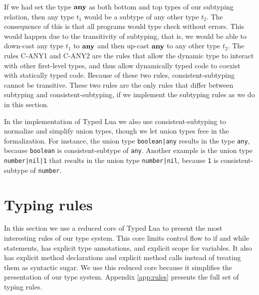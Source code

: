 If we had set the type $\mathbf{any}$ as both bottom and top types of our
subtyping relation, then any type $t_{1}$ would be a subtype of
any other type $t_{2}$.
The consequence of this is that all programs would type check without errors.
This would happen due to the transitivity of subtyping, that is,
we would be able to down-cast any type $t_{1}$ to $\mathbf{any}$ and then up-cast
$\mathbf{any}$ to any other type $t_{2}$.
The rules \textsc{C-ANY1} and \textsc{C-ANY2} are the rules that
allow the dynamic type to interact with other first-level types,
and thus allow dynamically typed code to coexist with statically
typed code.
Because of these two rules, consistent-subtyping cannot be transitive.
These two rules are the only rules that differ between
subtyping and consistent-subtyping, if we implement the subtyping rules
as we do in this section.

In the implementation of Typed Lua we also use consistent-subtyping to
normalize and simplify union types, though we let union types free in
the formalization.
For instance, the union type \texttt{boolean|any} results in the
type \texttt{any}, because \texttt{boolean} is consistent-subtype
of \texttt{any}.
Another example is the union type \texttt{number|nil|1} that
results in the union type \texttt{number|nil}, because
\texttt{1} is consistent-subtype of \texttt{number}.

\section{Typing rules}
\label{sec:rules}

In this section we use a reduced core of Typed Lua to present the
most interesting rules of our type system.
This core limits control flow to if and while statements,
has explicit type annotations, and explicit scope for variables.
It also has explicit method declarations and explicit method calls
instead of treating them as syntactic sugar.
We use this reduced core because it simplifies the presentation
of our type system.
Appendix \ref{app:rules} presents the full set of typing rules.

